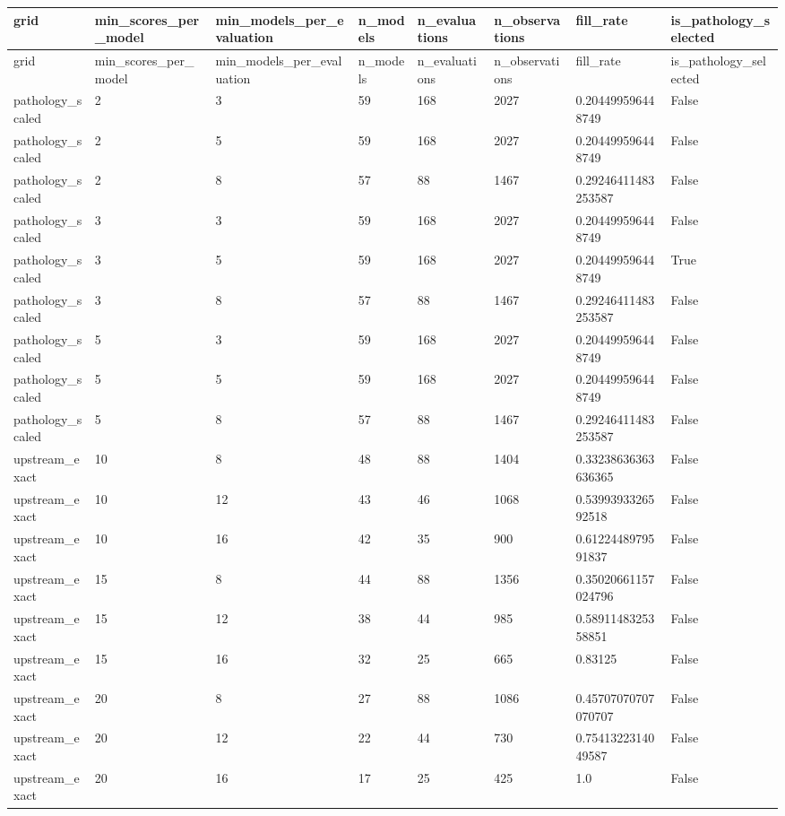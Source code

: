 \begin{longtable}{llllllll}
grid & min\_scores\_per\_model & min\_models\_per\_evaluation & n\_models & n\_evaluations & n\_observations & fill\_rate & is\_pathology\_selected \\
\hline
\endfirsthead
grid & min\_scores\_per\_model & min\_models\_per\_evaluation & n\_models & n\_evaluations & n\_observations & fill\_rate & is\_pathology\_selected \\
\hline
\endhead
pathology\_scaled & 2 & 3 & 59 & 168 & 2027 & 0.204499596448749 & False \\
pathology\_scaled & 2 & 5 & 59 & 168 & 2027 & 0.204499596448749 & False \\
pathology\_scaled & 2 & 8 & 57 & 88 & 1467 & 0.29246411483253587 & False \\
pathology\_scaled & 3 & 3 & 59 & 168 & 2027 & 0.204499596448749 & False \\
pathology\_scaled & 3 & 5 & 59 & 168 & 2027 & 0.204499596448749 & True \\
pathology\_scaled & 3 & 8 & 57 & 88 & 1467 & 0.29246411483253587 & False \\
pathology\_scaled & 5 & 3 & 59 & 168 & 2027 & 0.204499596448749 & False \\
pathology\_scaled & 5 & 5 & 59 & 168 & 2027 & 0.204499596448749 & False \\
pathology\_scaled & 5 & 8 & 57 & 88 & 1467 & 0.29246411483253587 & False \\
upstream\_exact & 10 & 8 & 48 & 88 & 1404 & 0.33238636363636365 & False \\
upstream\_exact & 10 & 12 & 43 & 46 & 1068 & 0.5399393326592518 & False \\
upstream\_exact & 10 & 16 & 42 & 35 & 900 & 0.6122448979591837 & False \\
upstream\_exact & 15 & 8 & 44 & 88 & 1356 & 0.35020661157024796 & False \\
upstream\_exact & 15 & 12 & 38 & 44 & 985 & 0.5891148325358851 & False \\
upstream\_exact & 15 & 16 & 32 & 25 & 665 & 0.83125 & False \\
upstream\_exact & 20 & 8 & 27 & 88 & 1086 & 0.45707070707070707 & False \\
upstream\_exact & 20 & 12 & 22 & 44 & 730 & 0.7541322314049587 & False \\
upstream\_exact & 20 & 16 & 17 & 25 & 425 & 1.0 & False \\
\end{longtable}
